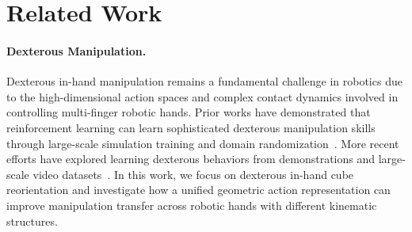 \vspace{-4mm}
\section{Related Work}
\vspace{-2mm}
\label{sec:rw}





\label{sec:related_work}

\paragraph{Dexterous Manipulation.}
Dexterous in-hand manipulation remains a fundamental challenge in robotics due to the high-dimensional action spaces and complex contact dynamics involved in controlling multi-finger robotic hands. Prior works have demonstrated that reinforcement learning can learn sophisticated dexterous manipulation skills through large-scale simulation training and domain randomization~\cite{andrychowicz2020learning,chen2022towards,handa2023dextreme,ma2024eureka,zakka2025mujocoplayground}. More recent efforts have explored learning dexterous behaviors from demonstrations and large-scale video datasets~\cite{shaw2023videodex,cheng2024open,wang2024dexcap,xu2025dexumi,li2025maniptrans,tao2025dexwild}. In this work, we focus on dexterous in-hand cube reorientation and investigate how a unified geometric action representation can improve manipulation transfer across robotic hands with different kinematic structures.

\vspace{-3mm}
